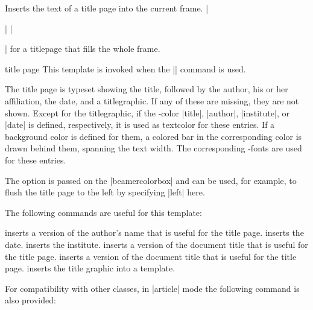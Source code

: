\begin{command}{\titlepage}
  Inserts the text of a title page into the current frame.
  \example
  |\begin{frame}\titlepage\end{frame}|
  \example
  |\begin{frame}[plain]\titlepage\end{frame}| for a titlepage that fills the whole frame.

  \begin{element}{title page}\yes\yes\yes
    This template is invoked when the |\titlepage| command is used.

    \begin{templateoptions}
      The title page is typeset showing the title, followed by the author, his or her affiliation, the date, and a titlegraphic. If any of these are missing, they are not shown. Except for the titlegraphic, if the \beamer-color |title|, |author|, |institute|, or |date| is defined, respectively, it is used as textcolor for these entries. If a background color is defined for them, a colored bar in the corresponding color is drawn behind them, spanning the text width. The corresponding \beamer-fonts are used for these entries.

      The  option is passed on the |beamercolorbox| and can be used, for example, to flush the title page to the left by specifying |left| here.
    \end{templateoptions}

    The following commands are useful for this template:
    \begin{templateinserts}
      \iteminsert{\insertauthor} inserts a version of the author's name that is useful for the title page.
      \iteminsert{\insertdate} inserts the date.
      \iteminsert{\insertinstitute} inserts the institute.
      \iteminsert{\inserttitle} inserts a version of the document title that is useful for the title page.
      \iteminsert{\insertsubtitle} inserts a version of the document title that is useful for the title page.
      \iteminsert{\inserttitlegraphic} inserts the title graphic into a template.
    \end{templateinserts}
  \end{element}
\end{command}

For compatibility with other classes, in |article| mode the following command is also provided:

